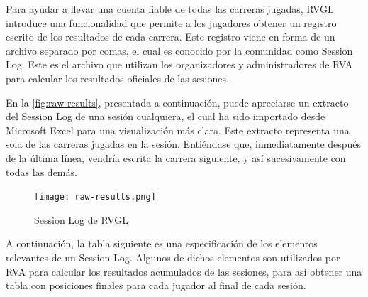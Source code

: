 Para ayudar a llevar una cuenta fiable de todas las carreras jugadas, RVGL introduce una funcionalidad que permite a los jugadores obtener un registro escrito de los resultados de cada carrera. Este registro viene en forma de un archivo separado por comas, el cual es conocido por la comunidad como Session Log. Este es el archivo que utilizan los organizadores y administradores de RVA para calcular los resultados oficiales de las sesiones.

En la \autoref{fig:raw-results}, presentada a continuación, puede apreciarse un extracto del Session Log de una sesión cualquiera, el cual ha sido importado desde Microsoft Excel para una visualización más clara. Este extracto representa una sola de las carreras jugadas en la sesión. Entiéndase que, inmediatamente después de la última línea, vendría escrita la carrera siguiente, y así sucesivamente con todas las demás.

\begin{figure}[H]
  \begin{center}
    \texttt{[image: raw-results.png]}
  \end{center}
  \caption[Session Log de RVGL]{Session Log de RVGL}
  \label{fig:raw-results}
\end{figure}

A continuación, la tabla siguiente es una especificación de los elementos relevantes de un Session Log. Algunos de dichos elementos son utilizados por RVA para calcular los resultados acumulados de las sesiones, para así obtener una tabla con posiciones finales para cada jugador al final de cada sesión.

